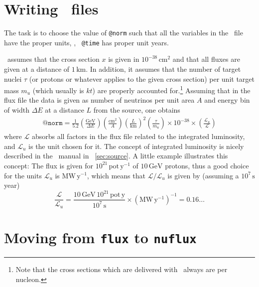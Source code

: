 \begin{appendix}
\section*{Writing \AEDL\ files}

The task is to choose the value of  {\tt @norm} such that all the
variables in the \AEDL\ file have the proper units, \eg , {\tt
  @time} has proper unit years.

\GLOBES\ assumes that the cross
section $x$ is given in $10^{-38}\,\mathrm{cm}^2$ and that all fluxes are
given at a distance of $1\,\mathrm{km}$. In addition, it assumes that
the number of target nuclei $\tau$ (or protons or whatever applies to the
given cross section) per unit target mass $m_u$ (which usually is $kt$)
 are properly accounted for.\footnote{Note that the cross sections which are delivered with
  \GLOBES\ always are per nucleon.}  Assuming that in the flux file
the data is given as number of neutrinos per unit area $A$ and
energy bin of width $\Delta E$ at a distance $L$ from the source, one
obtains
\begin{eqnarray}
\mathtt{@norm}=\frac{1}{5.2}\left(\frac{\mathrm{GeV}}{\Delta
      E}\right)
\left(\frac{\mathrm{cm}^2}{A}\right)\left(\frac{L}{\mathrm{km}}\right)^2\left(\frac{\tau}{m_u}\right)\times10^{-38}\times\left(\frac{\mathcal{L}_u}{\mathcal{L}}\right)
\end{eqnarray}
where $\mathcal{L}$ absorbs all factors in the flux file related to
the integrated luminosity, and $\mathcal{L}_u$ is the unit chosen for
it.  The concept of integrated luminosity is
nicely described in the \GLOBES\ manual in \Sec~\ref{sec:source}.
A little example illustrates this concept:
The flux is given for $10^{21}\, \mathrm{pot}\,\mathrm{y}^{-1}$ of
$10\,\mathrm{GeV}$ protons, thus a good choice for the units $\mathcal{L}_u$
is $\mathrm{MW}\,\mathrm{y}^{-1}$, which means that
$\mathcal{L}/\mathcal{L}_u$ is given by (assuming a $10^7\,\mathrm{s}$
year)
\begin{equation}
\frac{\mathcal{L}}{\mathcal{L}_u}=\frac{10\,\mathrm{GeV}\,10^{21}\,\mathrm{pot}\,\mathrm{y}}{10^7\,\mathrm{s}}\times(\mathrm{MW}\,\mathrm{y}^{-1})^{-1}=0.16\ldots
\end{equation}

\section*{Moving from {\tt flux} to {\tt nuflux}}


\end{appendix}
